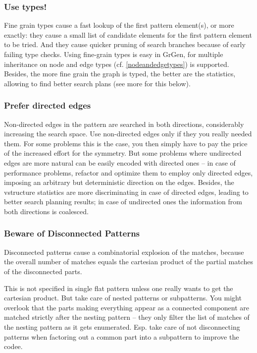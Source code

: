 \subsubsection*{Use types!}
Fine grain types cause a fast lookup of the first pattern element(s), or more exactly: they cause a small list of candidate elements for the first pattern element to be tried.
And they cause quicker pruning of search branches because of early failing type checks.
Using fine-grain types is easy in GrGen, for multiple inheritance on node and edge types (cf. \ref{nodeandedgetypes}) is supported.
Besides, the more fine grain the graph is typed, the better are the statistics, allowing \GrG{ } to find better search plans (see more for this below).

\subsubsection*{Prefer directed edges}
Non-directed edges in the pattern are searched in both directions, considerably increasing the search space.
Use non-directed edges only if they you really needed them.
For some problems this is the case, you then simply have to pay the price of the increased effort for the symmetry.
But some problems where undirected edges are more natural can be easily encoded with directed ones -- in case of performance problems, refactor and optimize them to employ only directed edges, imposing an arbitrary but deterministic direction on the edges.
Besides, the vstructure statistics are more discriminating in case of directed edges, leading to better search planning results; in case of undirected ones the information from both directions is coalesced.


\subsubsection*{Beware of Disconnected Patterns}
Disconnected patterns cause a combinatorial explosion of the matches, because the overall number of matches equals the cartesian product of the partial matches of the disconnected parts. 

This is not specified in single flat pattern unless one really wants to get the cartesian product.
But take care of nested patterns or subpatterns.
You might overlook that the parts making everything appear as a connected component are matched strictly after the nesting pattern -- they only filter the list of matches of the nesting pattern as it gets enumerated.
Esp. take care of not disconnecting patterns when factoring out a common part into a subpattern to improve the codee.

